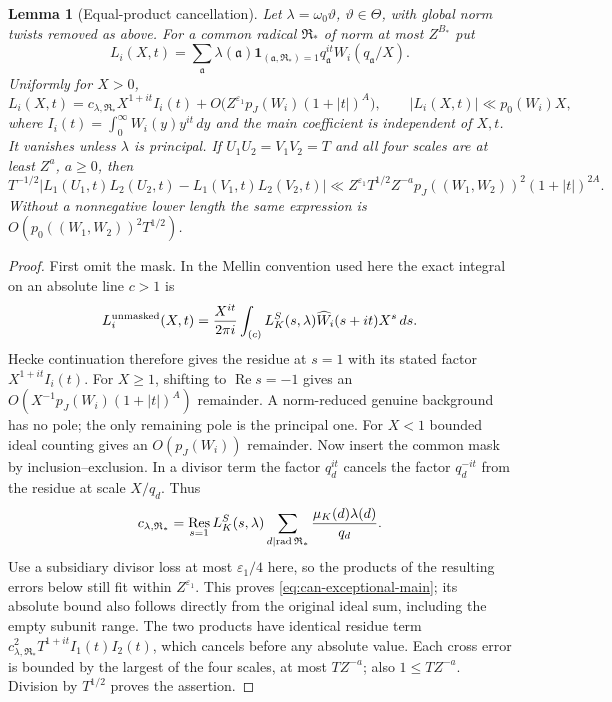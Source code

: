 \documentclass[11pt,a4paper]{article}
\numberwithin{equation}{section}
\newtheorem{lemma}[theorem]{Lemma}
\theoremstyle{definition}
\theoremstyle{remark}
\newcommand{\eps}{\varepsilon}
\newcommand{\Rea}{\operatorname{Re}}
\newcommand{\rad}{\operatorname{rad}}
\begin{document}
\begin{lemma}[Equal-product cancellation]\label{lem:can-exceptional}
Let $\lambda=\omega_0\vartheta$, $\vartheta\in\Theta$, with global
norm twists removed as above.  For a common radical
$\mathfrak R_*$ of norm at most $Z^{B_*}$ put
\[
 L_i(X,t)=\sum_{\mathfrak a}\lambda(\mathfrak a)
       \mathbf1_{(\mathfrak a,\mathfrak R_*)=1}
       q_{\mathfrak a}^{it}W_i(q_{\mathfrak a}/X).
\]
Uniformly for $X>0$,
\begin{equation}\label{eq:can-exceptional-main}
 L_i(X,t)=c_{\lambda,\mathfrak R_*}X^{1+it}I_i(t)
           +O\bigl(Z^{\eps_1}p_J(W_i)(1+|t|)^A\bigr),
 \qquad |L_i(X,t)|\ll p_0(W_i)X,
\end{equation}
where $I_i(t)=\int_0^\infty W_i(y)y^{it}\,dy$ and the main
coefficient is independent of $X,t$.
It vanishes unless $\lambda$ is principal.
If $U_1U_2=V_1V_2=T$ and all four scales are at least $Z^a$, $a\ge0$,
then
\begin{equation}\label{eq:can-exceptional-centered}
 T^{-1/2}|L_1(U_1,t)L_2(U_2,t)-L_1(V_1,t)L_2(V_2,t)|
 \ll Z^{\eps_1}T^{1/2}Z^{-a}p_J((W_1,W_2))^2(1+|t|)^{2A}.
\end{equation}
Without a nonnegative lower length the same expression is
$O(p_0((W_1,W_2))^2T^{1/2})$.
\end{lemma}
\begin{proof}
First omit the mask.  In the Mellin convention used here the exact
integral on an absolute line $c>1$ is
\[
 L_i^{\rm unmasked}(X,t)
   =\frac{X^{it}}{2\pi i}\int_{(c)}
       L_K^S(s,\lambda)\widehat W_i(s+it)X^s\,ds.
\]
Hecke continuation \cite{Tate} therefore gives the residue at
$s=1$ with its stated factor $X^{1+it}I_i(t)$.
For $X\ge1$, shifting to $\Rea s=-1$ gives an
$O(X^{-1}p_J(W_i)(1+|t|)^A)$ remainder.  A norm-reduced genuine background has no pole;
the only remaining pole is the principal one.
For $X<1$ bounded ideal counting gives an $O(p_J(W_i))$ remainder.
Now insert the common mask by inclusion--exclusion.  In a divisor
term the factor $q_d^{it}$ cancels the factor $q_d^{-it}$ from
the residue at scale $X/q_d$.  Thus
\[
 c_{\lambda,\mathfrak R_*}
  =\mathop{\rm Res}_{s=1}L_K^S(s,\lambda)
       \sum_{d\mid\rad\mathfrak R_*}\frac{\mu_K(d)\lambda(d)}{q_d}.
\]
Use a subsidiary divisor loss at most $\eps_1/4$ here, so the
products of the resulting errors below still fit within $Z^{\eps_1}$.
This proves \eqref{eq:can-exceptional-main}; its absolute
bound also follows directly from the original ideal sum, including
the empty subunit range.
The two products have identical residue term
$c_{\lambda,\mathfrak R_*}^2T^{1+it}I_1(t)I_2(t)$, which cancels
before any absolute value.  Each cross error is bounded by the
largest of the four scales, at most $TZ^{-a}$; also
$1\le TZ^{-a}$.  Division by $T^{1/2}$ proves the assertion.
\end{proof}
\end{document}
